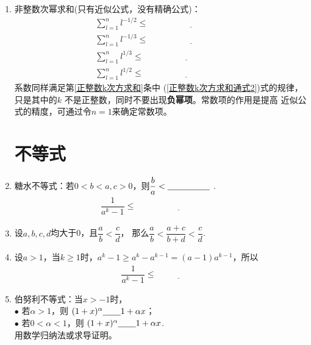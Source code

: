 \documentclass{article}
\newif\ifte
\renewcommand\leq\leqslant
\renewcommand\geq\geqslant
\begin{document}
\begin{multicols}{2}
\begin{enumerate}[leftmargin=20pt]
\item 非整数次幂求和(只有近似公式，没有精确公式)：
\begin{align*}
    &\sum\limits_{l=1}^{n} l^{-1/2}\leq \underline{\ \ifte 
       2n^{1/2}-1 \else \hspace{4cm} \fi\ }  \\  
    &\sum\limits_{l=1}^{n} l^{-1/3}\leq \underline{\ \ifte 
      \dfrac{3}{2}n^{2/3}-\dfrac{1}{2} \else \hspace{4cm} \fi\ }  \\ 
    &\sum\limits_{l=1}^{n} l^{1/3}\leq \underline{\ \ifte 
       \dfrac{3}{4}n^{4/3}+\dfrac{1}{2}n^{1/3}-\dfrac{1}{4}
       \else \hspace{4cm} \fi\ }  \\
    &\sum\limits_{l=1}^{n} l^{1/2}\leq \underline{\ \ifte 
        \dfrac{2}{3}n^{3/2} +\dfrac{1}{2}n^{1/2}-
        \dfrac{1}{6} \else \hspace{4cm} \fi\ }
\end{align*}
系数同样满足第\ref{正整数k次方求和}条中
(\ref{正整数k次方求和通式2})式的规律，只是其中的$ k $
不是正整数，同时不要出现\textbf{负幂项}。常数项的作用是提高
近似公式的精度，可通过令$ n=1 $来确定常数项。

\section{不等式}

\item 糖水不等式：若$ 0<b<a,c>0 $，则$ \dfrac{b}{a}<
\underline{\ \ifte \dfrac{b+c}{a+c}\else \hspace{1.5cm} \fi\ } $ .
\begin{gather*}
    \dfrac{1}{a^k-1}\leq \underline{\ \ifte 
    \dfrac{1+1}{a^k-1+1}=\dfrac{2}{a^{k}} \else \hspace{4cm} \fi\ }
\end{gather*}

\item 设$ a,b,c,d $均大于0，且$ \dfrac{a}{b}<\dfrac{c}{d} $，
那么$ \dfrac{a}{b}<\dfrac{a+c}{b+d}<\dfrac{c}{d} $. 

\item 设$ a>1 $，当$ k\geq 1 $时，$ a^k-1\geq a^k-a^{k-1}=(a-1)a^{k-1}$，所以
\begin{gather*}
    \dfrac{1}{a^k-1}\leq \underline{\ \ifte 
    \dfrac{1}{(a-1)a^{k-1}} \else \hspace{2cm} \fi\ }
\end{gather*}

\item 伯努利不等式：当$ x>-1 $时，\\
$ \bullet $ 若$ \alpha>1 $，则 $ (1+x)^{\alpha} \underline{\ 
    \ifte \geq \else \hspace{0.5cm} \fi\ } 1+\alpha x  $；\\
$ \bullet $ 若$ 0<\alpha<1 $，则 $ (1+x)^{\alpha} \underline{\ 
    \ifte \leq \else \hspace{0.5cm} \fi\ } 1+\alpha x $. \\
用数学归纳法或求导证明。


\end{enumerate}
\end{multicols}
\end{document}
